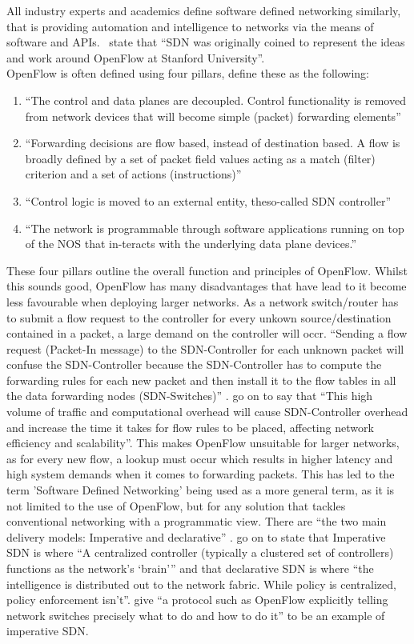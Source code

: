 All industry experts and academics define software defined networking
similarly, that is providing automation and intelligence to networks via the
means of software and APIs.~\citet{11} state that ``SDN was originally coined
to represent the ideas and work around OpenFlow at Stanford University''.\\ OpenFlow
is often defined using four pillars, \citet{11} define these as the following:
\begin{enumerate}
    \item ``The control and data planes are decoupled. Control functionality is
          removed from network devices that will become simple (packet)
          forwarding
          elements''
    \item ``Forwarding decisions are flow based, instead of destination based.
          A flow is broadly defined by a set of packet field values acting as a
          match
          (filter) criterion and a set of actions (instructions)''
    \item ``Control logic is moved to an external entity, theso-called SDN
          controller''
    \item ``The network is programmable through software applications running
          on top of the NOS that in-teracts with the underlying data plane
          devices.''
\end{enumerate}
These four pillars outline the overall function and principles of OpenFlow. Whilst this sounds good, OpenFlow has many disadvantages that have lead to it become less favourable when deploying larger networks. As a network switch/router has to submit a flow request to the controller for every unkown source/destination contained in a packet, a large demand on the controller will occr. ``Sending a flow request (Packet-In message) to the SDN-Controller for each unknown packet will confuse the SDN-Controller because the SDN-Controller has to compute the forwarding rules for each new packet and then install it to the flow tables in all the data forwarding nodes (SDN-Switches)'' \citep{app11156999}. \citeauthor{app11156999} go on to say that ``This high volume of traffic and computational overhead will cause SDN-Controller overhead and increase the time it takes for flow rules to be placed, affecting network efficiency and scalability''. This makes OpenFlow unsuitable for larger networks, as for every new flow, a lookup must occur which results in higher latency and high system demands when it comes to forwarding packets. This has led to the term 'Software Defined Networking' being used as a more general term, as it is not limited to the use of OpenFlow, but for any solution that tackles conventional networking with a programmatic view. There are ``the two main
delivery models: Imperative and declarative'' \citet{10}. \citet{10} go on to
state that Imperative SDN is
where ``A centralized controller (typically a clustered set of controllers)
functions as the network’s ‘brain’'' and that declarative SDN is where
``the intelligence is distributed out to the network fabric. While policy is
centralized, policy enforcement isn’t''. \citet{10} give ``a protocol such as
OpenFlow explicitly
telling network switches precisely what to do and how to do it'' to be an
example of imperative SDN.

